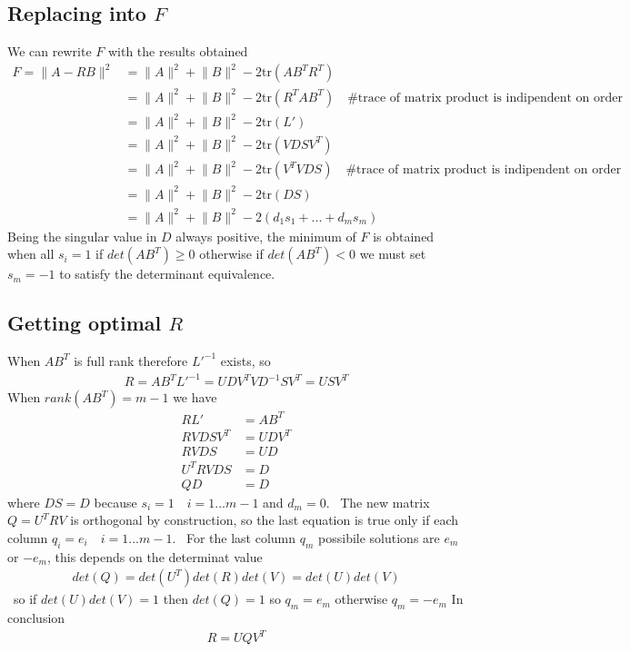 \documentclass{report}
\begin{document}
\subsection{Replacing into $F$}
We can rewrite $F$ with the results obtained
\begin{align}
    F=\lVert A-RB \rVert^2 &= \lVert A \rVert^2 + \lVert B \rVert^2 - 2\text{tr}(AB^TR^T) \\
    &= \lVert A \rVert^2 + \lVert B \rVert^2 - 2\text{tr}(R^TAB^T) \quad \text{\#trace of matrix product is indipendent on order} \\
    &= \lVert A \rVert^2 + \lVert B \rVert^2 - 2\text{tr}(L') \\
    &= \lVert A \rVert^2 + \lVert B \rVert^2 - 2\text{tr}(VDSV^T) \\
    &= \lVert A \rVert^2 + \lVert B \rVert^2 - 2\text{tr}(V^TVDS) \quad \text{\#trace of matrix product is indipendent on order} \\
    &= \lVert A \rVert^2 + \lVert B \rVert^2 - 2\text{tr}(DS) \\
    &= \lVert A \rVert^2 + \lVert B \rVert^2 - 2(d_1s_1+...+d_ms_m)
\end{align}
Being the singular value in $D$ always positive, the minimum of $F$ is obtained when all $s_i=1$ if $det(AB^T)\geq0$ otherwise
if $det(AB^T)<0$ we must set $s_m=-1$ to satisfy the determinant equivalence.


\subsection{Getting optimal $R$}
When $AB^T$ is full rank therefore $L'^{-1}$ exists, so
\begin{align}
    R = AB^TL'^{-1}=UDV^TVD^{-1}SV^T = USV^T
\end{align}
When $rank(AB^T)=m-1$  we have
\begin{align}
    RL' &= AB^T \\
    RVDSV^T&=UDV^T\\
    RVDS &= UD \\
    U^TRVDS &= D \\
    QD &= D
\end{align}
where $DS=D$ because $s_i = 1 \quad i=1...m-1$ and $d_m=0$. \
The new matrix $Q=U^TRV$ is orthogonal by construction, so the last equation is true only if each column $q_i = e_i \quad i=1...m-1$. \
For the last column $q_m$ possibile solutions are $e_m$ or $-e_m$, this depends on the determinat value
\begin{align}
    det(Q) = det(U^T)det(R)det(V) = det(U)det(V)
\end{align}\
so if $det(U)det(V)=1$ then $det(Q)=1$ so $q_m=e_m$ otherwise $q_m=-e_m$
In conclusion
\begin{align}
    R = UQV^T
\end{align}
\end{document}
